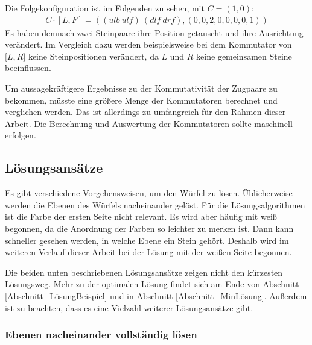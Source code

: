 \documentclass[12pt,a4paper, usenames, dvipsnames]{article}
\theoremstyle{mystyle}
\theoremstyle{definition}
\begin{document}
Die Folgekonfiguration ist im Folgenden zu sehen, mit $C=(1,0)$:
\begin{align*}
C \cdot [L, F] = (( \textit{ulb} \ \textit{ulf} ) \ (\textit{dlf} \ \textit{drf} ), (0,0,2,0,0,0,0,1) )
\end{align*}
Es haben demnach zwei Steinpaare ihre Position getauscht und ihre Ausrichtung verändert. Im Vergleich dazu werden beispielsweise bei dem Kommutator von $\lbrack L, R \rbrack$ keine Steinpositionen verändert, da $L$ und $R$ keine gemeinsamen Steine beeinflussen.

Um aussagekräftigere Ergebnisse zu der Kommutativität der Zugpaare zu bekommen, müsste eine größere Menge der Kommutatoren berechnet und verglichen werden. Das ist allerdings zu umfangreich für den Rahmen dieser Arbeit. Die Berechnung und Auswertung der Kommutatoren sollte maschinell erfolgen.

%
%
%
%
%
%
%
%
%
%
%
%
%
%
%
%
%
%
%
%
\subsection{Lösungsansätze}
\label{Abschnitt_Lösungsansätze}


Es gibt verschiedene Vorgehensweisen, um den Würfel zu lösen. Üblicherweise werden die Ebenen des Würfels nacheinander gelöst. 
Für die Lösungsalgorithmen ist die Farbe der ersten Seite nicht relevant. Es wird aber häufig mit weiß begonnen, da die Anordnung der Farben so leichter zu merken ist. Dann kann schneller gesehen werden, in welche Ebene ein Stein gehört. \cite{RF} Deshalb wird im weiteren Verlauf dieser Arbeit bei der Lösung mit der weißen Seite begonnen.

Die beiden unten beschriebenen Lösungsansätze zeigen nicht den kürzesten Lösungsweg. Mehr zu der optimalen Lösung findet sich am Ende von Abschnitt \ref{Abschnitt_LösungBeispiel} und in Abschnitt \ref{Abschnitt_MinLösung}. Außerdem ist zu beachten, dass es eine Vielzahl weiterer Lösungsansätze gibt.


\subsubsection*{Ebenen nacheinander vollständig lösen}
\end{document}
